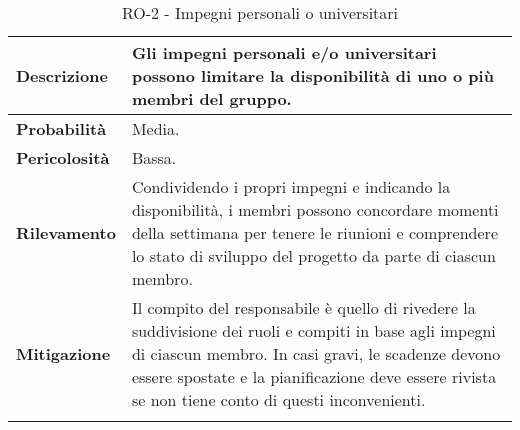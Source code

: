 \newpage


\begin{longtable}{ | l | p{12cm} | }
	\hline
	\textbf{Descrizione}  & Gli impegni personali e/o universitari possono limitare la disponibilità di uno o più membri del gruppo.                                                                                                                                                           \\
	\hline
	\textbf{Probabilità}  & Media.                                                                                                                                                                                                                                                             \\
	\hline
	\textbf{Pericolosità} & Bassa.                                                                                                                                                                                                                                                             \\
	\hline
	\textbf{Rilevamento}  & Condividendo i propri impegni e indicando la disponibilità, i membri possono concordare momenti della settimana per tenere le riunioni e comprendere lo stato di sviluppo del progetto da parte di ciascun membro.                                                 \\
	\hline
	\textbf{Mitigazione}  & Il compito del responsabile è quello di rivedere la suddivisione dei ruoli e compiti in base agli impegni di ciascun membro. In casi gravi, le scadenze devono essere spostate e la pianificazione deve essere rivista se non tiene conto di questi inconvenienti. \\
	\hline
	\caption{RO-2 - Impegni personali o universitari}
	\label{table:2}
\end{longtable}


